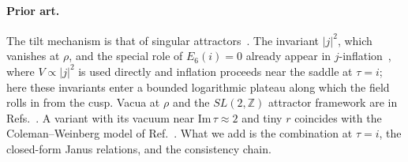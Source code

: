 \documentclass[aps,prd,twocolumn,superscriptaddress,nofootinbib,floatfix]{revtex4-2}
\begin{document}
\paragraph{Prior art.} The tilt mechanism is that of singular attractors~\cite{arXiv_2512_02969}. The invariant $|j|^2$, which vanishes at $\rho$, and the special role of $E_6(i)=0$ already appear in $j$-inflation~\cite{arXiv_1612_09559}, where $V\propto|j|^2$ is used directly and inflation proceeds near the saddle at $\tau=i$; here these invariants enter a bounded logarithmic plateau along which the field rolls in from the cusp. Vacua at $\rho$ and the $SL(2,\mathbb{Z})$ attractor framework are in Refs.~\cite{arXiv_2408_05203,arXiv_2412_19324}. A variant with its vacuum near $\mathrm{Im}\,\tau \approx 2$ and tiny $r$ coincides with the Coleman--Weinberg model of Ref.~\cite{arXiv_2607_00528}. What we add is the combination at $\tau = i$, the closed-form Janus relations, and the consistency chain.
\end{document}
